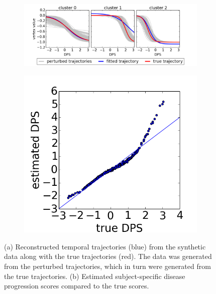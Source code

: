 \documentclass{llncs}
\begin{document}
\begin{figure}[h]
\begin{subfigure}[b]{0.75\textwidth}
  \hspace{-2em}
  \includegraphics[width=1.15\textwidth,trim=0 10 0 50]{figures//synThetaRes_gensigInitk-meansCl3Pr1Ra0_VWDPMStd.png}
  \caption{}
  \label{fig:synThetaRes}
\end{subfigure}
\hspace{-1em}
\begin{subfigure}[b]{0.24\textwidth}
\centering
  \includegraphics[width=1.2\textwidth,trim=0 20 0 50]{figures/synShiftsRes_gensigInitk-meansCl3Pr1Ra0_VWDPMStd.png}
    \vspace{0.7em}
  \caption{}
  \label{fig:synShiftRes}
\end{subfigure}
\caption{(a) Reconstructed temporal trajectories (blue) from the synthetic data along with the true trajectories (red). The data was generated from the perturbed trajectories, which in turn were generated from the true trajectories. (b) Estimated subject-specific disease progression scores compared to the true scores.}
\end{figure}
\end{document}

